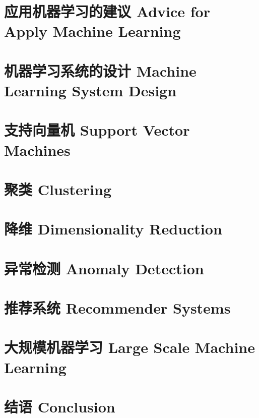 \documentclass[12pt, a4paper]{article}
\begin{document}
\section{应用机器学习的建议 Advice for Apply Machine Learning}

\section{机器学习系统的设计 Machine Learning System Design}

\section{支持向量机 Support Vector Machines}

\section{聚类 Clustering}

\section{降维 Dimensionality Reduction}

\section{异常检测 Anomaly Detection}

\section{推荐系统 Recommender Systems}

\section{大规模机器学习 Large Scale Machine Learning}

\section{结语 Conclusion}
\end{document}
